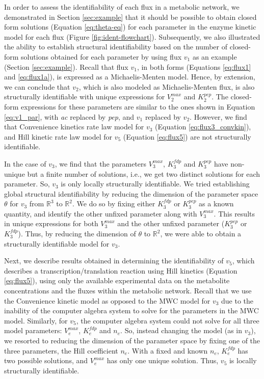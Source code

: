 \documentclass[10pt]{article}
\begin{document}
	In order to assess the identifiability of each flux in a metabolic network, we demonstrated in Section \ref{sec:example} that it should be possible to obtain closed form solutions (Equation \ref{eq:theta-eq}) for each parameter in the enzyme kinetic model for each flux (Figure \ref{fig:ident-flowchart}). Subsequently, we also illustrated the ability to establish structural identifiability based on the number of closed-form solutions obtained for each parameter by using flux $v_1$ as an example (Section \ref{sec:example}). Recall that flux $v_1$, in both forms (Equations \ref{eq:flux1} and \ref{eq:flux1a}), is expressed as a Michaelis-Menten model. Hence, by extension, we can conclude that $v_2$, which is also modeled as Michaelis-Menten flux, is also structurally identifiable with unique expressions for $V_2^{max}$ and $K_2^{pep}$. The closed-form expressions for these parameters are similar to the ones shown in Equation \ref{eq:v1_par}, with \textit{ac} replaced by \textit{pep}, and $v_1$ replaced by $v_2$. 
	However, we find that Convenience kinetics rate law model for $v_3$ (Equation \ref{eq:flux3_convkin}), and Hill kinetic rate law model for $v_5$ (Equation \ref{eq:flux5}) are not structurally identifiable.
	
	In the case of $v_3$, we find that the parameters $V_3^{max}$, $K_3^{fdp}$ and $K_3^{pep}$ have non-unique but a finite number of solutions, i.e., we get two distinct solutions for each parameter. So, $v_3$ is only locally structurally identifiable. We tried establishing global structural identifiability by reducing the dimension of the parameter space $\theta$ for $v_3$ from $\mathbb{R}^3$ to $\mathbb{R}^2$. We do so by fixing either $K_3^{fdp}$ or $K_3^{pep}$ as a known quantity, and identify the other unfixed parameter along with $V_3^{max}$. This results in unique expressions for both $V_3^{max}$ and the other unfixed parameter ($K_3^{pep}$ or $K_3^{fdp}$). Thus, by reducing the dimension of $\theta$ to $\mathbb{R}^2$, we were able to obtain a structurally identifiable model for $v_3$.  
	
	Next, we describe results obtained in determining the identifiability of $v_5$, which describes a transcription/translation reaction using Hill kinetics (Equation \ref{eq:flux5}), using only the available experimental data on the metabolite concentrations and the fluxes within the metabolic network. 	
	Recall that we use the Convenience kinetic model as opposed to the MWC model for $v_3$ due to the inability of the computer algebra system to solve for the parameters in the MWC model. Similarly, for $v_5$, the computer algebra system could not solve for all three model parameters: $V_e^{max}$, $K_e^{fdp}$ and $n_e$. So, instead changing the model (as in $v_3$), we resorted to reducing the dimension of the parameter space by fixing one of the three parameters, the Hill coefficient $n_e$. With a fixed and known $n_e$, $K_e^{fdp}$ has two possible solutions, and $V_e^{max}$ has only one unique solution. Thus, $v_5$ is locally structurally identifiable. 
	
\end{document}
